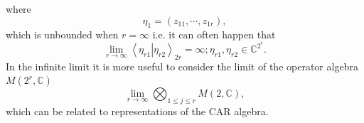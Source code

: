 \documentclass[aps,preprint]{revtex4}%
\begin{document}
where
\begin{equation}
\eta_{1}=\left(  z_{11},\cdots,z_{1r}\right)  ,
\end{equation}
which is unbounded when $r=\infty$ i.e. it can often happen that
\begin{equation}
\lim\limits_{r\rightarrow\infty}\left\langle \left.  \eta_{r1}\right\vert
\eta_{r2}\right\rangle _{2r}=\infty;\eta_{r1},\eta_{r2}\in\mathbb{C}^{2^{r}}.
\end{equation}
In the infinite limit it is more useful to consider the limit of the operator
algebra $M\left(  2^{r},\mathbb{C}\right)  $
\begin{equation}
\lim\limits_{r\rightarrow\infty}%
{\textstyle\bigotimes_{1\leq j\leq r}}
M\left(  2,\mathbb{C}\right)  ,
\end{equation}
which can be related to representations of the CAR algebra.
\end{document}
